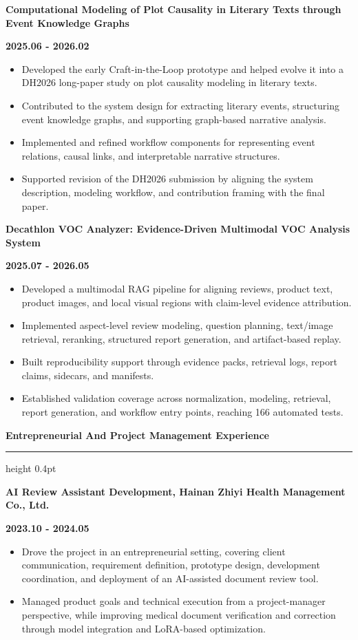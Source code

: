 \documentclass[10pt,a4paper]{article}
\newcommand{\cvsection}[1]{%
  \vspace{10pt}%
  {\Large\bfseries #1}\par%
  \vspace{1pt}%
  \hrule height 0.4pt%
  \vspace{3pt}%
}
\newcommand{\entrytitle}[1]{\textbf{#1}\par}
\newcommand{\entrydate}[1]{\textbf{#1}\par}
\begin{document}
\vspace{4pt}
\entrytitle{Computational Modeling of Plot Causality in Literary Texts through Event Knowledge Graphs}
\entrydate{2025.06 - 2026.02}
\begin{itemize}
  \item Developed the early Craft-in-the-Loop prototype and helped evolve it into a DH2026 long-paper study on plot causality modeling in literary texts.
  \item Contributed to the system design for extracting literary events, structuring event knowledge graphs, and supporting graph-based narrative analysis.
  \item Implemented and refined workflow components for representing event relations, causal links, and interpretable narrative structures.
  \item Supported revision of the DH2026 submission by aligning the system description, modeling workflow, and contribution framing with the final paper.
\end{itemize}

\vspace{4pt}
\entrytitle{Decathlon VOC Analyzer: Evidence-Driven Multimodal VOC Analysis System}
\entrydate{2025.07 - 2026.05}
\begin{itemize}
  \item Developed a multimodal RAG pipeline for aligning reviews, product text, product images, and local visual regions with claim-level evidence attribution.
  \item Implemented aspect-level review modeling, question planning, text/image retrieval, reranking, structured report generation, and artifact-based replay.
  \item Built reproducibility support through evidence packs, retrieval logs, report claims, sidecars, and manifests.
  \item Established validation coverage across normalization, modeling, retrieval, report generation, and workflow entry points, reaching 166 automated tests.
\end{itemize}

\cvsection{Entrepreneurial And Project Management Experience}
\entrytitle{AI Review Assistant Development, Hainan Zhiyi Health Management Co., Ltd.}
\entrydate{2023.10 - 2024.05}
\begin{itemize}
  \item Drove the project in an entrepreneurial setting, covering client communication, requirement definition, prototype design, development coordination, and deployment of an AI-assisted document review tool.
  \item Managed product goals and technical execution from a project-manager perspective, while improving medical document verification and correction through model integration and LoRA-based optimization.
\end{itemize}
\end{document}
